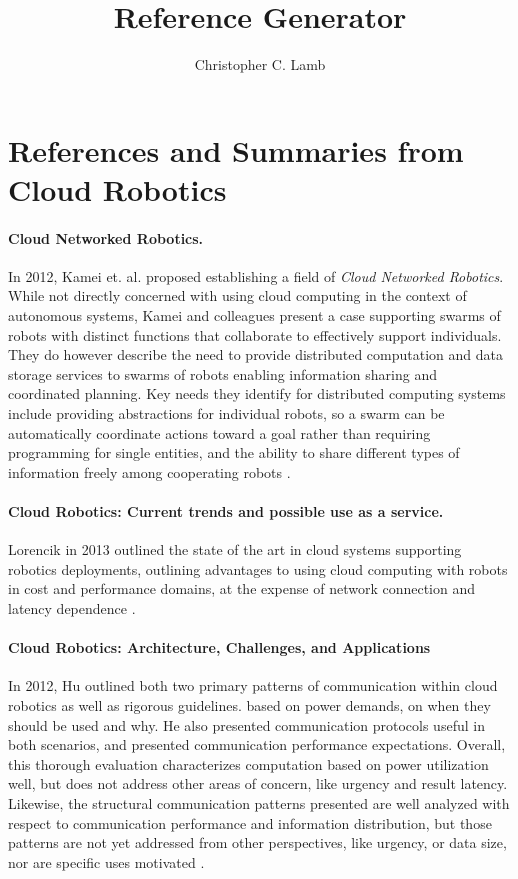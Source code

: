 \documentclass[10pt,letterpaper]{article}
\author{Christopher C. Lamb}
\title{Reference Generator}
\begin{document}
\section{References and Summaries from Cloud Robotics}

\paragraph{Cloud Networked Robotics.} In 2012, Kamei et. al. proposed establishing a field of {\sl Cloud Networked Robotics}.  While not directly concerned with using cloud computing in the context of autonomous systems, Kamei and colleagues present a case supporting swarms of robots with distinct functions that collaborate to effectively support individuals.  They do however describe the need to provide distributed computation and data storage services to swarms of robots enabling information sharing and coordinated planning.  Key needs they identify for distributed computing systems include providing abstractions for individual robots, so a swarm can be automatically coordinate actions toward a goal rather than requiring programming for single entities, and the ability to share different types of information freely among cooperating robots \cite{KaNiHaSa:12}.

\paragraph{Cloud Robotics: Current trends and possible use as a service.} Lorencik in 2013 outlined the state of the art in cloud systems supporting robotics deployments, outlining advantages to using cloud computing with robots in cost and performance domains, at the expense of network connection and latency dependence \cite{LoSi:13}.

\paragraph{Cloud Robotics: Architecture, Challenges, and Applications}
In 2012, Hu outlined both two primary patterns of communication within cloud robotics as well as rigorous guidelines. based on power demands, on when they should be used and why.  He also presented communication protocols useful in both scenarios, and presented communication performance expectations.  Overall, this thorough evaluation characterizes computation based on power utilization well, but does not address other areas of concern, like urgency and result latency.  Likewise, the structural communication patterns presented are well analyzed with respect to communication performance and information distribution, but those patterns are not yet addressed from other perspectives, like urgency, or data size, nor are specific uses motivated \cite{HuWeYo:12}.
\end{document}
